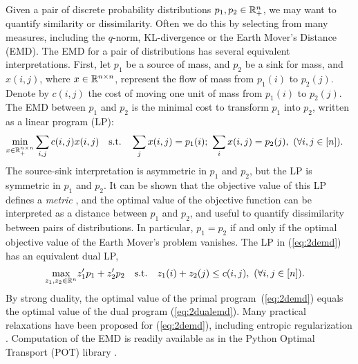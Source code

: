 Given a pair of discrete probability distributions $p_1,p_2\in\mathbb{R}^{n}_+$, we may want to quantify similarity or dissimilarity. 
Often we do this by selecting from many measures, including the $q$-norm, KL-divergence or the Earth Mover's Distance (EMD).
%
The EMD for a pair of distributions has several equivalent interpretations. First, let $p_1$ be a source of mass, and $p_2$ be a sink for mass, and  $x(i,j)$, where  $x\in\mathbb{R}^{n\times n}$, represent the flow of mass from $p_1(i)$ to $p_2(j)$.
Denote by $c(i,j)$ the cost of moving one unit of mass from  $p_1(i)$ to $p_2(j)$.
The EMD between $p_1$ and $p_2$ is the minimal cost to transform $p_1$ into $p_2$, 
written as a linear program (LP):
\begin{align}\label{eq:2demd}
\begin{aligned}
\underset{{x\in \RR^{n\times n}_+}}{\textrm{min}} \sum_{i,j} c(i,j) x(i,j) \quad  \textrm{s.t.}\quad \sum_j x(i,j) &= p_1(i); \ 
\sum_i x(i,j) = p_2(j),\ (\forall i,j\in[n]).
\end{aligned}
\end{align}
The source-sink interpretation is asymmetric in $p_1$ and $p_2$, but the LP is symmetric in $p_1$ and $p_2$.  It can be shown that the objective value of this LP defines a {\em metric} \citep{kantorovich1960mathematical}, and the optimal value of the objective function can be interpreted as a distance between $p_1$ and $p_2$,  %
and useful to quantify dissimilarity between pairs of distributions. In particular,  $p_1=p_2$ if and only if the optimal objective value of the Earth Mover's problem vanishes.
%
The LP in (\ref{eq:2demd}) has an equivalent dual LP, 
\begin{align}\label{eq:2dualemd}\begin{aligned}
    &\underset{z_1,z_2\in\mathbb{R}^{n}}{\textrm{max}} z_1'p_1 + z_2'p_2 \quad 
    \textrm{s.t.}\quad  z_1(i) + z_2(j)\leq c(i,j),\  (\forall i,j\in [n]).
    \end{aligned}
\end{align}
By strong duality, the optimal value of the primal program~(\ref{eq:2demd}) equals the optimal value of the dual program (\ref{eq:2dualemd}). 
Many practical relaxations have been proposed for (\ref{eq:2demd}), including entropic regularization \citep{cuturi2013sinkhorn}.
Computation of the EMD is readily available as in the Python Optimal Transport (POT) library \citep{flamary2021pot}.

